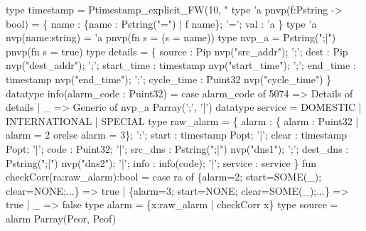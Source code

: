\begin{code}
type timestamp = Ptimestamp_explicit_FW(10, "%
\mbox{}
type 'a pnvp(f:Pstring -> bool) =
      \{ name : \{name : Pstring("=") | f name\}; 
        '='; 
        val : 'a \}
type 'a nvp(name:string) = 'a pnvp(fn s = (s = name))
type nvp_a = Pstring(";|") pnvp(fn s = true)
\mbox{}
type details = \{
      source      : Pip nvp("src_addr");
';';  dest        : Pip nvp("dest_addr");
';';  start_time  : timestamp nvp("start_time");
';';  end_time    : timestamp nvp("end_time");
';';  cycle_time  : Puint32 nvp("cycle_time")
\}
\mbox{}
datatype info(alarm_code : Puint32) =
  case alarm_code of 
    5074 => Details of details
  | _    => Generic of nvp_a Parray(';', '|')
\mbox{}
datatype service = DOMESTIC | INTERNATIONAL | SPECIAL
\mbox{}
type raw_alarm = \{
       alarm    : \{ alarm : Puint32 | alarm = 2 orelse alarm = 3\};
 ':';  start    : timestamp Popt;
 '|';  clear    : timestamp Popt;
 '|';  code     : Puint32;
 '|';  src_dns  : Pstring(";|") nvp("dns1");
 ';';  dest_dns : Pstring(";|") nvp("dns2");
 '|';  info     : info(code);
 '|';  service  : service
\}
\mbox{}
fun checkCorr(ra:raw_alarm):bool =
  case ra of 
    \{alarm=2; start=SOME(_); clear=NONE;...\} => true
  | \{alarm=3; start=NONE;    clear=SOME(_);...\} => true
  |  _ => false
\mbox{}
type alarm = \{x:raw_alarm | checkCorr x\}
\mbox{}
type source = alarm Parray(Peor, Peof)
\end{code}
